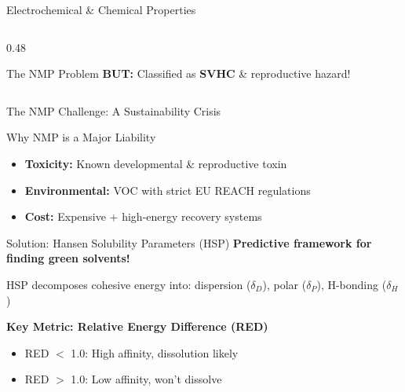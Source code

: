 \documentclass[aspectratio=169]{beamer}
\begin{document}
\begin{frame}{Electrochemical \& Chemical Properties}
\begin{columns}[T]
\begin{column}{0.48\textwidth}
\begin{alertblock}{The NMP Problem}
                \vspace{0.1cm}
                \textcolor{AlertRed}{\textbf{BUT:}} Classified as \textbf{SVHC} \& reproductive hazard!
            \end{alertblock}
        \end{column}
    \end{columns}
\end{frame}

\begin{frame}{The NMP Challenge: A Sustainability Crisis}
    \begin{block}{Why NMP is a Major Liability}
        \begin{itemize}\small
            \item \textbf{Toxicity:} Known developmental \& reproductive toxin
            \item \textbf{Environmental:} VOC with strict EU REACH regulations
            \item \textbf{Cost:} Expensive + high-energy recovery systems
        \end{itemize}
    \end{block}
    
    \begin{exampleblock}{Solution: Hansen Solubility Parameters (HSP)}
        \small
        \textbf{Predictive framework for finding green solvents!}
        
        HSP decomposes cohesive energy into: dispersion ($\delta_D$), polar ($\delta_P$), H-bonding ($\delta_H$)
        
        \vspace{0.1cm}
        \textbf{Key Metric: Relative Energy Difference (RED)}
        \begin{itemize}
            \item RED $<$ 1.0: High affinity, dissolution likely
            \item RED $>$ 1.0: Low affinity, won't dissolve
        \end{itemize}
    \end{exampleblock}
\end{frame}
\end{document}
